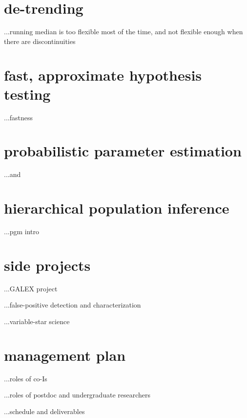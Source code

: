 \documentclass[letterpaper,12pt]{article}
\newcommand{\Bart}{\package{Bart}}
\newcommand{\emcee}{\package{emcee}}
\begin{document}
\section{de-trending}

...running median is too flexible most of the time, and not flexible enough when there are discontinuities

\section{fast, approximate hypothesis testing}

...fastness

\section{probabilistic parameter estimation}

...\Bart and \emcee

\section{hierarchical population inference}

...pgm intro

\section{side projects}

...GALEX project

...false-positive detection and characterization

...variable-star science

\section{management plan}

...roles of co-Is

...roles of postdoc and undergraduate researchers

...schedule and deliverables
\end{document}
